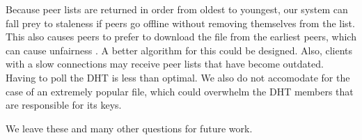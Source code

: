 Because peer lists are returned in order from oldest to youngest, our system can fall prey to  staleness if peers
go offline without removing themselves from the list. This also causes peers to prefer to download the file
from the earliest peers, which can cause unfairness \cite{Brian_Thesis}. A better algorithm for
this could be designed. Also, clients with a slow connections may receive peer lists that
have become outdated.  Having to poll the DHT is less than optimal.  
We also do not accomodate for the case of an extremely popular file, which could overwhelm the DHT members that are responsible for its keys.

We leave these and many other questions for future work.